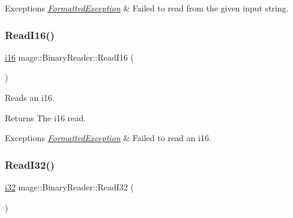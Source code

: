 \begin{DoxyExceptions}{Exceptions}
{\em \hyperlink{structmage_1_1_formatted_exception}{Formatted\+Exception}} & Failed to read from the given input string. \\
\hline
\end{DoxyExceptions}
\hypertarget{classmage_1_1_binary_reader_a7fb2f143eb79f90229a157d344236c2b}{}\label{classmage_1_1_binary_reader_a7fb2f143eb79f90229a157d344236c2b} 
\subsubsection{\texorpdfstring{Read\+I16()}{ReadI16()}}
{\footnotesize\ttfamily \hyperlink{namespacemage_a80228058266cc2ec5868d65b2a4c2f3c}{i16} mage\+::\+Binary\+Reader\+::\+Read\+I16 (\begin{DoxyParamCaption}{ }\end{DoxyParamCaption})\hspace{0.3cm}{\ttfamily [protected]}}

Reads an {\ttfamily i16}.

\begin{DoxyReturn}{Returns}
The {\ttfamily i16} read. 
\end{DoxyReturn}

\begin{DoxyExceptions}{Exceptions}
{\em \hyperlink{structmage_1_1_formatted_exception}{Formatted\+Exception}} & Failed to read an {\ttfamily i16}. \\
\hline
\end{DoxyExceptions}
\hypertarget{classmage_1_1_binary_reader_a0bff822c17c18e85cf7e05340acb1d9a}{}\label{classmage_1_1_binary_reader_a0bff822c17c18e85cf7e05340acb1d9a} 
\subsubsection{\texorpdfstring{Read\+I32()}{ReadI32()}}
{\footnotesize\ttfamily \hyperlink{namespacemage_ad59a7dbc22c51c308b6df9e9c3cafd62}{i32} mage\+::\+Binary\+Reader\+::\+Read\+I32 (\begin{DoxyParamCaption}{ }\end{DoxyParamCaption})\hspace{0.3cm}{\ttfamily [protected]}}

